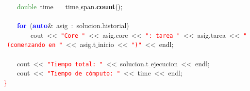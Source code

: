 \mbox{}\ \ \ \ \textcolor{ForestGreen}{double}\ time\ \textcolor{BrickRed}{=}\ time$\_$span\textcolor{BrickRed}{.}\textbf{\textcolor{Black}{count}}\textcolor{BrickRed}{();} \\
\mbox{} \\
\mbox{}\ \ \ \ \textbf{\textcolor{Blue}{for}}\ \textcolor{BrickRed}{(}\textbf{\textcolor{Blue}{auto}}\textcolor{BrickRed}{\&}\ asig\ \textcolor{BrickRed}{:}\ solucion\textcolor{BrickRed}{.}historial\textcolor{BrickRed}{)} \\
\mbox{}\ \ \ \ \ \ \ \ cout\ \textcolor{BrickRed}{\textless{}\textless{}}\ \texttt{\textcolor{Red}{"{}Core\ "{}}}\ \textcolor{BrickRed}{\textless{}\textless{}}\ asig\textcolor{BrickRed}{.}core\ \textcolor{BrickRed}{\textless{}\textless{}}\ \texttt{\textcolor{Red}{"{}:\ tarea\ "{}}}\ \textcolor{BrickRed}{\textless{}\textless{}}\ asig\textcolor{BrickRed}{.}tarea\ \textcolor{BrickRed}{\textless{}\textless{}}\ \texttt{\textcolor{Red}{"{}\ (comenzando\ en\ "{}}}\ \textcolor{BrickRed}{\textless{}\textless{}}\ asig\textcolor{BrickRed}{.}t$\_$inicio\ \textcolor{BrickRed}{\textless{}\textless{}}\ \texttt{\textcolor{Red}{"{})"{}}}\ \textcolor{BrickRed}{\textless{}\textless{}}\ endl\textcolor{BrickRed}{;} \\
\mbox{} \\
\mbox{}\ \ \ \ cout\ \textcolor{BrickRed}{\textless{}\textless{}}\ \texttt{\textcolor{Red}{"{}Tiempo\ total:\ "{}}}\ \textcolor{BrickRed}{\textless{}\textless{}}\ solucion\textcolor{BrickRed}{.}t$\_$ejecucion\ \textcolor{BrickRed}{\textless{}\textless{}}\ endl\textcolor{BrickRed}{;} \\
\mbox{}\ \ \ \ cout\ \textcolor{BrickRed}{\textless{}\textless{}}\ \texttt{\textcolor{Red}{"{}Tiempo\ de\ cómputo:\ "{}}}\ \textcolor{BrickRed}{\textless{}\textless{}}\ time\ \textcolor{BrickRed}{\textless{}\textless{}}\ endl\textcolor{BrickRed}{;} \\
\mbox{}\textcolor{Red}{\}} \\
\mbox{}

